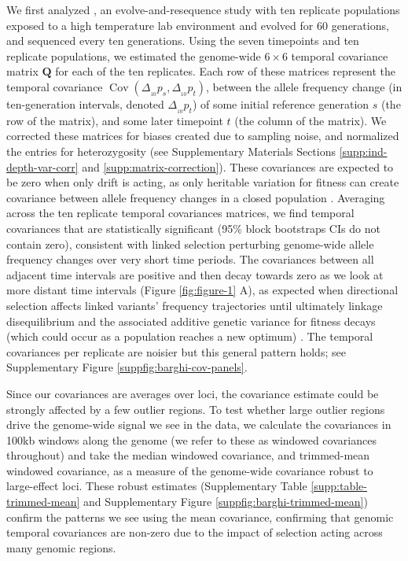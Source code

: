 \documentclass[11pt]{article}
\DeclareMathOperator{\cov}{Cov}
\begin{document}
We first analyzed \textcite{Barghi2019-qy}, an evolve-and-resequence study with
ten replicate populations exposed to a high temperature lab environment and
evolved for 60 generations, and sequenced every ten generations. Using the
seven timepoints and ten replicate populations, we estimated the genome-wide $6
\times 6$ temporal covariance matrix $\mathbf{Q}$ for each of the ten
replicates. Each row of these matrices represent the temporal covariance
$\cov(\Delta_{_{10}} p_s, \Delta_{_{10}} p_t)$, between the allele frequency
change (in ten-generation intervals, denoted $\Delta_{_{10}} p_t$) of some
initial reference generation $s$ (the row of the matrix), and some later
timepoint $t$ (the column of the matrix). We corrected these matrices for
biases created due to sampling noise, and normalized the entries for
heterozygosity (see Supplementary Materials Sections
\ref{supp:ind-depth-var-corr} and \ref{supp:matrix-correction}). These
covariances are expected to be zero when only drift is acting, as only
heritable variation for fitness can create covariance between allele frequency
changes in a closed population \parencite{Buffalo2019-io}.  Averaging across
the ten replicate temporal covariances matrices, we find temporal covariances
that are statistically significant (95\% block bootstraps CIs do not contain
zero), consistent with linked selection perturbing genome-wide allele frequency
changes over very short time periods. The covariances between all adjacent time
intervals are positive and then decay towards zero as we look at more distant
time intervals (Figure \ref{fig:figure-1} A), as expected when directional
selection affects linked variants' frequency trajectories until ultimately
linkage disequilibrium and the associated additive genetic variance for fitness
decays (which could occur as a population reaches a new optimum)
\parencite{Buffalo2019-io}. The temporal covariances per replicate are noisier
but this general pattern holds; see Supplementary Figure
\ref{suppfig:barghi-cov-panels}. 

Since our covariances are averages over loci, the covariance estimate could be
strongly affected by a few outlier regions. To test whether large outlier
regions drive the genome-wide signal we see in the \textcite{Barghi2019-qy}
data, we calculate the covariances in 100kb windows along the genome (we refer
to these as windowed covariances throughout) and take the median windowed
covariance, and trimmed-mean windowed covariance, as a measure of the
genome-wide covariance robust to large-effect loci. These robust estimates
(Supplementary Table \ref{supp:table-trimmed-mean} and Supplementary Figure
\ref{suppfig:barghi-trimmed-mean}) confirm the patterns we see using the mean
covariance, confirming that genomic temporal covariances are non-zero due to
the impact of selection acting across many genomic regions. 
\end{document}
